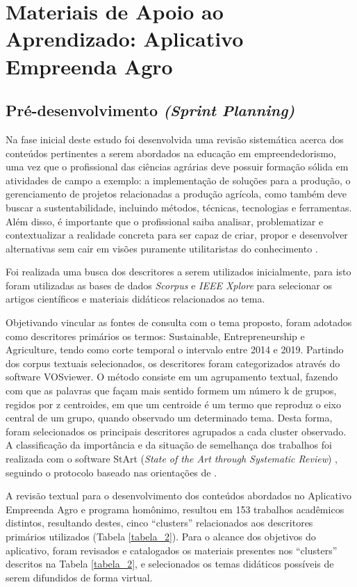 \section{Materiais de Apoio ao Aprendizado: Aplicativo Empreenda Agro}

\subsection{Pré-desenvolvimento \textit{(Sprint Planning)}}

Na fase inicial deste estudo foi desenvolvida uma revisão sistemática acerca dos conteúdos pertinentes a serem abordados na educação em empreendedorismo, uma vez que o profissional das ciências agrárias deve possuir formação sólida em atividades de campo a exemplo: a implementação de soluções para a produção, o gerenciamento de projetos relacionadas a produção agrícola, como também deve buscar a sustentabilidade, incluindo métodos, técnicas, tecnologias e ferramentas. Além disso, é importante que o profissional saiba analisar, problematizar e contextualizar a realidade concreta para ser capaz de criar, propor e desenvolver alternativas sem cair em visões puramente utilitaristas do conhecimento \cite{cavalcanti_da_2019}.

Foi realizada uma busca dos descritores a serem utilizados inicialmente, para isto foram utilizadas as bases de dados \textit{Scorpus} e \textit{IEEE Xplore} para selecionar os artigos científicos e materiais didáticos relacionados ao tema.

Objetivando vincular as fontes de consulta com o tema proposto, foram adotados como descritores primários os termos: Sustainable, Entrepreneurship e Agriculture, tendo como corte temporal o intervalo entre 2014 e 2019. Partindo dos corpus textuais selecionados, os descritores foram categorizados através do software VOSviewer. O método consiste em um agrupamento textual, fazendo com que as palavras que façam mais sentido formem um número k de grupos, regidos por z centroides, em que um centroide é um termo que reproduz o eixo central de um grupo, quando observado um determinado tema. Desta forma, foram selecionados os principais descritores agrupados a cada cluster observado. A classificação da importância e da situação de semelhança dos trabalhos foi realizada com o software StArt (\textit{State of the Art through Systematic Review}) \cite{lapes_start_2005}, seguindo o protocolo baseado nas orientações de . 

A revisão textual para o desenvolvimento dos conteúdos abordados no Aplicativo Empreenda Agro e programa homônimo, resultou em 153 trabalhos acadêmicos distintos, resultando destes, cinco “clusters” relacionados aos descritores primários utilizados (Tabela \ref{tabela_2}). Para o alcance dos objetivos do aplicativo, foram revisados e catalogados os materiais presentes nos “clusters” descritos na Tabela \ref{tabela_2}, e selecionados os temas didáticos possíveis de serem difundidos de forma virtual.


